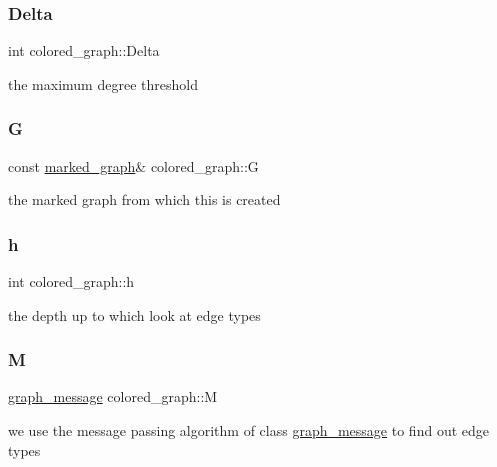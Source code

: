 \subsubsection{\texorpdfstring{Delta}{Delta}}
{\footnotesize\ttfamily int colored\+\_\+graph\+::\+Delta}



the maximum degree threshold 

\mbox{\label{classcolored__graph_a39186b56cad58c368d6947656976e18d}} 
\subsubsection{\texorpdfstring{G}{G}}
{\footnotesize\ttfamily const \hyperlink{classmarked__graph}{marked\+\_\+graph}\& colored\+\_\+graph\+::G}



the marked graph from which this is created 

\mbox{\label{classcolored__graph_ae27062a4ee59df2670d3a0c81e85a3fa}} 
\subsubsection{\texorpdfstring{h}{h}}
{\footnotesize\ttfamily int colored\+\_\+graph\+::h}



the depth up to which look at edge types 

\mbox{\label{classcolored__graph_ab72c568fe12f7c849ca6bffb145aec47}} 
\subsubsection{\texorpdfstring{M}{M}}
{\footnotesize\ttfamily \hyperlink{classgraph__message}{graph\+\_\+message} colored\+\_\+graph\+::M}



we use the message passing algorithm of class \hyperlink{classgraph__message}{graph\+\_\+message} to find out edge types 

\mbox{\label{classcolored__graph_a90ece8eb1fec52f3f41549ab527c1d5b}} 
